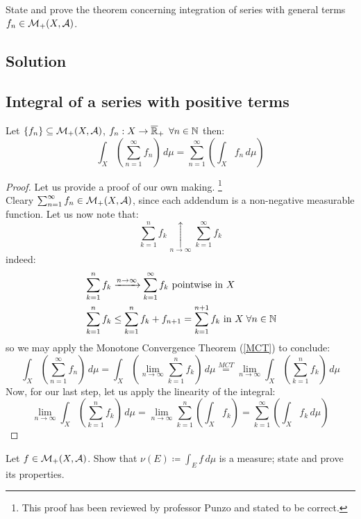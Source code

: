 \sheet 


\question
State and prove the theorem concerning integration of series with general terms $f_n \in \mathcal{M}_+(X, \mathcal{A})$.

\subsection*{Solution}

\subsection{Integral of a series with positive terms} \label{IntoS:pos}
Let $\{ f_n \}\subseteq \mathcal{M}_+(X,\mathcal{A})$, $f_n :X\to\overline{\mathbb{R}}_{+}$ $\forall n \in \mathbb{N}$ then:
\[
    \int_X \left( \sum_{n=1}^\infty f_n \right) \, d\mu = \sum_{n=1}^\infty  \left( \int_X f_n \, d\mu \right)   
\]

\begin{proof} Let us provide a proof of our own making. \footnote{
        This proof has been reviewed by professor Punzo and stated to be correct.
    }\\
    Cleary $\sum_{n=1}^\infty f_n \in \mathcal{M}_+(X,\mathcal{A})$, since each addendum is a non-negative measurable function. Let us now note that:
    \[
        \sum_{k=1}^n f_k \underset{n\to\infty}{\uparrow} \sum_{k=1}^\infty f_k
    \]
    indeed:
    \begin{align*}
        & \sum_{k=1}^n f_k \xrightarrow{n\to\infty} \sum_{k=1}^\infty f_k \text{ pointwise in } X\\
        & \sum_{k=1}^n f_k \leq \sum_{k=1}^n f_k + f_{n+1} = \sum_{k=1}^{n+1}f_k \text{ in } X \; \forall n\in\mathbb{N}
    \end{align*}
    so we may apply the Monotone Convergence Theorem (\ref{MCT}) to conclude:
    \[
        \int_X \left( \sum_{n=1}^\infty f_n \right) \, d\mu =  \int_X \left( \lim_{n\to\infty} \sum_{k=1}^n f_k \right) \, d\mu \overset{MCT}{=} \lim_{n\to\infty}\int_X \left(  \sum_{k=1}^n f_k \right) \, d\mu
    \]
    Now, for our last step, let us apply the linearity of the integral:
    \[
        \lim_{n\to\infty}\int_X \left(  \sum_{k=1}^n f_k \right) \, d\mu = \lim_{n\to\infty} \sum_{k=1}^n \left( \int_X  f_k  \right) = \sum_{k=1}^\infty  \left( \int_X f_k \, d\mu \right)
    \]
\end{proof}


\question
Let $f \in\mathcal{M}_+(X, \mathcal{A})$. Show that $\nu(E) \coloneqq \int_E f \, d\mu$ is a measure; state and prove its properties.


